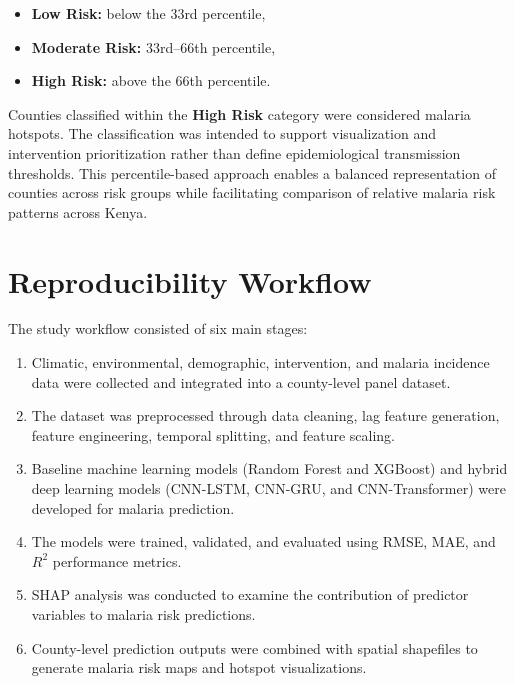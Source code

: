 	\begin{itemize}
		\item \textbf{Low Risk:} below the 33rd percentile,
		\item \textbf{Moderate Risk:} 33rd--66th percentile,
		\item \textbf{High Risk:} above the 66th percentile.
	\end{itemize}
	
	Counties classified within the \textbf{High Risk} category were considered malaria hotspots. The classification was intended to support visualization and intervention prioritization rather than define epidemiological transmission thresholds. This percentile-based approach enables a balanced representation of counties across risk groups while facilitating comparison of relative malaria risk patterns across Kenya.
  \section{Reproducibility Workflow}
  
  The study workflow consisted of six main stages:
  
  \begin{enumerate}
  	\item Climatic, environmental, demographic, intervention, and malaria incidence data were collected and integrated into a county-level panel dataset.
  	
  	\item The dataset was preprocessed through data cleaning, lag feature generation, feature engineering, temporal splitting, and feature scaling.
  	
  	\item Baseline machine learning models (Random Forest and XGBoost) and hybrid deep learning models (CNN-LSTM, CNN-GRU, and CNN-Transformer) were developed for malaria prediction.
  	
  	\item The models were trained, validated, and evaluated using RMSE, MAE, and $R^2$ performance metrics.
  	
  	\item SHAP analysis was conducted to examine the contribution of predictor variables to malaria risk predictions.
  	
  	\item County-level prediction outputs were combined with spatial shapefiles to generate malaria risk maps and hotspot visualizations.
  \end{enumerate}
  
